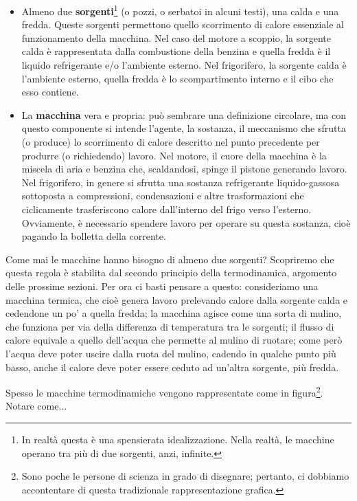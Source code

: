 \begin{itemize}
    \item Almeno due \textbf{sorgenti}\footnote{In realtà questa è una
    spensierata idealizzazione. Nella realtà, le macchine
    operano tra più di due sorgenti, anzi, infinite.} (o pozzi, o serbatoi in alcuni
    testi), una calda e una fredda. Queste sorgenti
    permettono quello scorrimento di calore essenziale al
    funzionamento della macchina. Nel caso
    del motore a scoppio, la sorgente calda è rappresentata dalla
    combustione della benzina e quella fredda è il
    liquido refrigerante e/o l'ambiente esterno. Nel
    frigorifero, la sorgente calda è l'ambiente esterno,
    quella fredda è lo scompartimento interno e il
    cibo che esso contiene.

    \item La \textbf{macchina} vera e propria: può sembrare
    una definizione circolare, ma con questo componente
    si intende l'agente, la sostanza, il meccanismo
    che sfrutta (o produce) lo scorrimento di
    calore descritto nel punto precedente per
    produrre (o richiedendo) lavoro. Nel motore,
    il cuore della macchina è la miscela di aria
    e benzina che, scaldandosi, spinge il pistone
    generando lavoro. Nel frigorifero, in genere si
    sfrutta una sostanza refrigerante liquido-gassosa
    sottoposta a compressioni, condensazioni e altre
    trasformazioni che ciclicamente trasferiscono
    calore dall'interno del frigo verso l'esterno.
    Ovviamente, è necessario spendere lavoro per
    operare su questa sostanza, cioè pagando la
    bolletta della corrente.
\end{itemize}

Come mai le macchine hanno bisogno di almeno due sorgenti?
Scopriremo che questa regola è stabilita dal secondo principio
della termodinamica, argomento delle prossime sezioni.
Per ora ci basti pensare a questo:
consideriamo una macchina termica, che cioè genera lavoro
prelevando calore dalla sorgente calda e cedendone un po' a
quella fredda; la macchina agisce come
una sorta di mulino, che funziona per via della differenza
di temperatura tra le sorgenti; il flusso di calore equivale
a quello dell'acqua che permette al mulino di ruotare; come
però l'acqua deve poter uscire dalla ruota del mulino, cadendo
in qualche punto più basso, anche
il calore deve poter essere ceduto ad un'altra sorgente, più
fredda.

Spesso le macchine termodinamiche vengono rappresentate
come in figura\footnote{Sono poche le persone di scienza in grado di disegnare;
pertanto, ci dobbiamo accontentare di questa tradizionale
rappresentazione grafica.}. Notare come...

